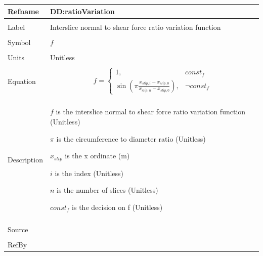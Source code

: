 \documentclass[12pt]{article}
\begin{document}
 \noindent \begin{minipage}{\textwidth}
\begin{tabular}{p{} p{}}
\toprule \textbf{Refname} & \textbf{DD:ratioVariation}
\label{DD:ratioVariation}
\\ \midrule \\
Label & Interslice normal to shear force ratio variation function
        \\ \midrule \\
        Symbol & $f$
                 \\ \midrule \\
                 Units & Unitless
                         \\ \midrule \\
                         Equation & \begin{displaymath}
                                    f=\begin{cases}
1, & const_f\\
\sin\left(π \frac{{x_{slip,i}}-{x_{slip,0}}}{{x_{slip,n}}-{x_{slip,0}}}\right), & \neg{}const_f
\end{cases}
                                    \end{displaymath}
                                    \\ \midrule \\
                                    Description & \begin{symbDescription}
                                                  \item{$f$ is the interslice normal to shear force ratio variation function (Unitless)}
                                                  \item{$π$ is the circumference to diameter ratio (Unitless)}
                                                  \item{${x_{slip}}$ is the x ordinate (m)}
                                                  \item{$i$ is the index (Unitless)}
                                                  \item{$n$ is the number of slices (Unitless)}
                                                  \item{$const_f$ is the decision on f (Unitless)}
                                                  \end{symbDescription}
                                                  \\ \midrule \\
                                                  Source & \cite{fredlund1977}
                                                           \\ \midrule \\
                                                           RefBy & 
\\ \bottomrule \end{tabular}
\end{minipage}\\
\end{document}
